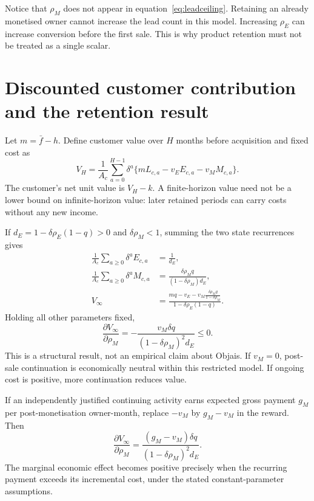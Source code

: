 \documentclass[11pt,a4paper]{article}
\begin{document}
Notice that $\rho_M$ does not appear in equation~\eqref{eq:leadceiling}. Retaining an already monetised owner cannot increase the lead count in this model. Increasing $\rho_E$ can increase conversion before the first sale. This is why product retention must not be treated as a single scalar.

\section{Discounted customer contribution and the retention result}

Let $m=\bar f-h$. Define customer value over $H$ months before acquisition and fixed cost as
\begin{equation}
 V_H=\frac{1}{A_c}\sum_{a=0}^{H-1}\delta^a
       \{mL_{c,a}-v_EE_{c,a}-v_MM_{c,a}\}.
 \label{eq:ltvfinite}
\end{equation}
The customer's net unit value is $V_H-k$. A finite-horizon value need not be a lower bound on infinite-horizon value: later retained periods can carry costs without any new income.

If $d_E=1-\delta\rho_E(1-q)>0$ and $\delta\rho_M<1$, summing the two state recurrences gives
\begin{align}
 \frac{1}{A_c}\sum_{a\geq0}\delta^aE_{c,a}&=\frac{1}{d_E},\\
 \frac{1}{A_c}\sum_{a\geq0}\delta^aM_{c,a}
 &=\frac{\delta\rho_Mq}{(1-\delta\rho_M)d_E},\\
 V_\infty&=
 \frac{mq-v_E-\displaystyle v_M\frac{\delta\rho_Mq}{1-\delta\rho_M}}
 {1-\delta\rho_E(1-q)}.
 \label{eq:ltvclosed}
\end{align}
Holding all other parameters fixed,
\begin{equation}
 \frac{\partial V_\infty}{\partial\rho_M}
 =-\frac{v_M\delta q}{(1-\delta\rho_M)^2d_E}\leq0.
 \label{eq:negative}
\end{equation}
This is a structural result, not an empirical claim about Objais. If $v_M=0$, post-sale continuation is economically neutral within this restricted model. If ongoing cost is positive, more continuation reduces value.

If an independently justified continuing activity earns expected gross payment $g_M$ per post-monetisation owner-month, replace $-v_M$ by $g_M-v_M$ in the reward. Then
\begin{equation}
 \frac{\partial V_\infty}{\partial\rho_M}
 =\frac{(g_M-v_M)\delta q}{(1-\delta\rho_M)^2d_E}.
 \label{eq:recurring}
\end{equation}
The marginal economic effect becomes positive precisely when the recurring payment exceeds its incremental cost, under the stated constant-parameter assumptions.
\end{document}
